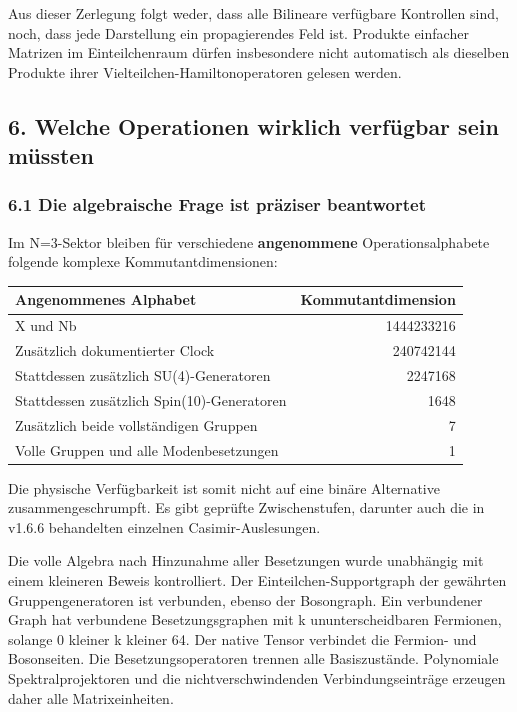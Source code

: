 Aus dieser Zerlegung folgt weder, dass alle Bilineare verfügbare
Kontrollen sind, noch, dass jede Darstellung ein propagierendes Feld
ist. Produkte einfacher Matrizen im Einteilchenraum dürfen insbesondere
nicht automatisch als dieselben Produkte ihrer
Vielteilchen-Hamiltonoperatoren gelesen werden.

\subsection{6. Welche Operationen wirklich verfügbar sein
müssten}\label{welche-operationen-wirklich-verfuxfcgbar-sein-muxfcssten}

\subsubsection{6.1 Die algebraische Frage ist präziser
beantwortet}\label{die-algebraische-frage-ist-pruxe4ziser-beantwortet}

Im N=3-Sektor bleiben für verschiedene \textbf{angenommene}
Operationsalphabete folgende komplexe Kommutantdimensionen:

{\def\LTcaptype{none} %
\begin{longtable}[]{@{}lr@{}}
\toprule\noalign{}
Angenommenes Alphabet & Kommutantdimension \\
\midrule\noalign{}
\endhead
\bottomrule\noalign{}
\endlastfoot
X und Nb & 1444233216 \\
Zusätzlich dokumentierter Clock & 240742144 \\
Stattdessen zusätzlich SU(4)-Generatoren & 2247168 \\
Stattdessen zusätzlich Spin(10)-Generatoren & 1648 \\
Zusätzlich beide vollständigen Gruppen & 7 \\
Volle Gruppen und alle Modenbesetzungen & 1 \\
\end{longtable}
}

Die physische Verfügbarkeit ist somit nicht auf eine binäre Alternative
zusammengeschrumpft. Es gibt geprüfte Zwischenstufen, darunter auch die
in v1.6.6 behandelten einzelnen Casimir-Auslesungen.

Die volle Algebra nach Hinzunahme aller Besetzungen wurde unabhängig mit
einem kleineren Beweis kontrolliert. Der Einteilchen-Supportgraph der
gewährten Gruppengeneratoren ist verbunden, ebenso der Bosongraph. Ein
verbundener Graph hat verbundene Besetzungsgraphen mit k
ununterscheidbaren Fermionen, solange 0 kleiner k kleiner 64. Der native
Tensor verbindet die Fermion- und Bosonseiten. Die Besetzungsoperatoren
trennen alle Basiszustände. Polynomiale Spektralprojektoren und die
nichtverschwindenden Verbindungseinträge erzeugen daher alle
Matrixeinheiten.

